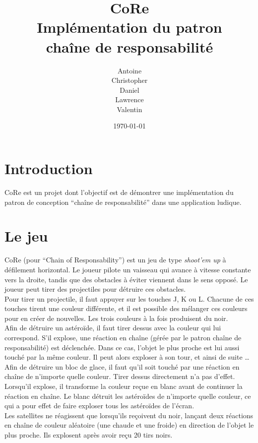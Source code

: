 \documentclass[11pt,a4paper,twoside,svgnames]{article}
\title{\color{Chocolate}\huge\bfseries CoRe\\Implémentation du patron\\chaîne de responsabilité}
\author{Antoine \bsc{Friant}\\
Christopher \bsc{Meier}\\
Daniel \bsc{Palumbo}\\
Lawrence \bsc{Stalder}\\
Valentin \bsc{Finini}}
\date{\today}
\begin{document}
\maketitle
\clearpage
\tableofcontents
\clearpage
\section{Introduction}
CoRe est un projet dont l'objectif est de démontrer une implémentation du patron de conception ``chaîne de responsabilité'' dans une application ludique.

\section{Le jeu}
CoRe (pour ``Chain of Responsability'') est un jeu de type \textit{shoot'em up} à défilement horizontal. Le joueur pilote un vaisseau qui avance à vitesse constante vers la droite, tandis que des obstacles à éviter viennent dans le sens opposé. Le joueur peut tirer des projectiles pour détruire ces obstacles.\\

Pour tirer un projectile, il faut appuyer sur les touches J, K ou L. Chacune de ces touches tirent une couleur différente, et il est possible des mélanger ces couleurs pour en créer de nouvelles. Les trois couleurs à la fois produisent du noir.\\

Afin de détruire un astéroïde, il faut tirer dessus avec la couleur qui lui correspond. S'il explose, une réaction en chaîne (gérée par le patron chaîne de responsabilité) est déclenchée. Dans ce cas, l'objet le plus proche est lui aussi touché par la même couleur. Il peut alors exploser à son tour, et ainsi de suite \ldots\\

Afin de détruire un bloc de glace, il faut qu'il soit touché par une réaction en chaîne de n'importe quelle couleur. Tirer dessus directement n'a pas d'effet. Lorsqu'il explose, il transforme la couleur reçue en blanc avant de continuer la réaction en chaîne. Le blanc détruit les astéroïdes de n'importe quelle couleur, ce qui a pour effet de faire exploser tous les astéroïdes de l'écran.\\

Les satellites ne réagissent que lorsqu'ils reçoivent du noir, lançant deux réactions en chaîne de couleur aléatoire (une chaude et une froide) en direction de l'objet le plus proche. Ils explosent après avoir reçu 20 tirs noirs.\\
\end{document}
